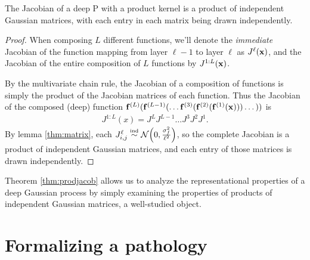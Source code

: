 \documentclass[twoside]{article}
\makeatletter
\newcommand{\fdeep}{\vf^{(1:L)}}
\newcommand{\Jxx}{J_{\vx \rightarrow \vy}(\vx)}
\newcommand{\Jy}{J_{\vy \rightarrow \vx}}
\newlength{\nonHumbleHeight}
\def\@humbleformat#1{{\settoheight{\nonHumbleHeight}{#1}\resizebox{!}{0.94\nonHumbleHeight}{#1}}}%
\def\humble#1{\@humbleformat{#1}}%
\newcommand{\gp}{{\humble GP}}
\newcommand{\sectiondist}{}
\makeatother
\begin{document}

\begin{theorem}
\label{thm:prodjacob}
The Jacobian of a deep \gp{} with a product kernel is a product of independent Gaussian matrices, with each entry in each matrix being drawn independently.
\end{theorem}
%
\begin{proof}
When composing $L$ different functions, we'll denote the \emph{immediate} Jacobian of the function mapping from layer $\ell -1$ to layer $\ell$ as $J^\ell({\bf{x}})$, and the Jacobian of the entire composition of $L$ functions by $J^{1:L}({\bf{x}})$.

By the multivariate chain rule, the Jacobian of a composition of functions is simply the product of the Jacobian matrices of each function.  
%
Thus the Jacobian of the composed (deep) function ${\bf{f}}^{(L)}({\bf{f}}^{(L-1)}(\dots {\bf{f}}^{(3)}( {\bf{f}}^{(2)}( {\bf{f}}^{(1)}({\bf{x}})))\dots))$ is
%
\begin{align}
 J^{1:L}(x) 
= J^L J^{L-1} \dots J^3 J^2 J^1. 
\end{align}
%
By lemma \ref{thm:matrix}, each ${J^\ell_{i,j} \simind \Nt{0}{\frac{\sigma^2_f}{\ell^2}}}$, so the complete Jacobian is a product of independent Gaussian matrices, and each entry of those matrices is drawn independently.
\end{proof}

\vspace{-0.1in}
Theorem \ref{thm:prodjacob} allows us to analyze the representational properties of a deep Gaussian process by simply examining the properties of products of independent Gaussian matrices, a well-studied object.




\section{Formalizing a pathology}
\sectiondist

\end{document}
